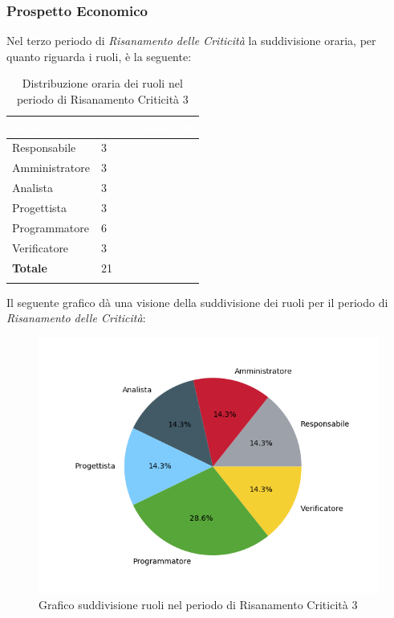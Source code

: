 \subsubsection{Prospetto Economico}
Nel terzo periodo di \textit{Risanamento delle Criticità} la suddivisione oraria, per quanto riguarda i ruoli, è la seguente: 

\begin{longtable}{| C{.30\textwidth}| C{.15\textwidth}| C{.20\textwidth}|}
	\hline
	\textbf{\textcolor{white}{Ruolo}} & \textbf{\textcolor{white}{Ore}} & \textbf{\textcolor{white}{Costo 	in \euro}} \\
	\hline 
	Responsabile & 3 &  \\
	\hline
	Amministratore & 3 &  \\
	\hline
	Analista & 3 &  \\
	\hline
	Progettista & 3 & \\
	\hline
	Programmatore & 6 &  \\
	\hline 
	Verificatore & 3 &  \\
	\hline
	\textbf{Totale} & 21 &  \\
	\hline 


\caption{Distribuzione oraria dei ruoli nel periodo di Risanamento Criticità 3}
\label{Distribuzione oraria per ruoli rc3}
\end{longtable}

Il seguente grafico dà una visione della suddivisione dei ruoli per il periodo di  \textit{Risanamento delle Criticità}:\begin{figure}[H]
	\centering
	\includegraphics[width=1\linewidth]{./images/torta_rc3.png}
	\caption{Grafico suddivisione ruoli nel periodo di Risanamento Criticità 3}
	\label{fig:grafico suddivione ruoli rc3}
\end{figure}

